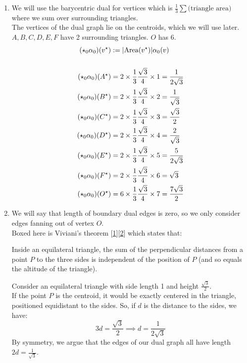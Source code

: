 \documentclass{article}
\newcommand\ifrac[2]{{\displaystyle\frac{#1}{#2}}}
\def\nt{\notag}
\begin{document}
\begin{enumerate}[label=(\alph*)]
    \item
    We will use the barycentric dual for vertices which is $\ifrac13 \sum\text{(triangle area)}$ where we sum over surrounding triangles.\\
    The vertices of the dual graph lie on the centroids, which we will use later.\\
    $A,B,C,D,E,F$ have 2 surrounding triangles. $O$ has 6. 
    \begin{align}
        (\star_0\alpha_0)(v^\star) &:= |\text{Area}(v^\star)|\alpha_0(v) \nt\\\nt\\
        (\star_0\alpha_0)(A^\star) &= 2 \times \frac13 \frac{\sqrt3}{4} \times 1 = \frac{1}{2 \sqrt{3}} \nt\\
        (\star_0\alpha_0)(B^\star) &= 2 \times \frac13 \frac{\sqrt3}{4} \times 2 = \frac{1}{\sqrt{3}} \nt\\
        (\star_0\alpha_0)(C^\star) &= 2 \times \frac13 \frac{\sqrt3}{4} \times 3 = \frac{\sqrt{3}}{2} \nt\\
        (\star_0\alpha_0)(D^\star) &= 2 \times \frac13 \frac{\sqrt3}{4} \times 4 = \frac{2}{\sqrt{3}} \nt\\
        (\star_0\alpha_0)(E^\star) &= 2 \times \frac13 \frac{\sqrt3}{4} \times 5 = \frac{5}{2 \sqrt{3}} \nt\\
        (\star_0\alpha_0)(F^\star) &= 2 \times \frac13 \frac{\sqrt3}{4} \times 6 = \sqrt{3} \nt\\
        (\star_0\alpha_0)(O^\star) &= 6 \times \frac13 \frac{\sqrt3}{4} \times 7 = \frac{7 \sqrt{3}}{2} \nt
    \end{align}

    \item 
    We will say that length of boundary dual edges is zero, so we only consider edges fanning out of vertex $O$.\\
    Boxed here is Viviani's theorem [\href{https://en.wikipedia.org/wiki/Viviani%27s_theorem}{1}][\href{https://www.google.com/url?sa=t&rct=j&q=&esrc=s&source=web&cd=&cad=rja&uact=8&ved=2ahUKEwjqvLnXps35AhXbGVkFHUDADcYQFnoECA0QAw&url=https%3A%2F%2Fwww.maa.org%2Fsites%2Fdefault%2Ffiles%2FChen-CMJ-2006.pdf&usg=AOvVaw0kXL5NnMvqD5_oh29f4N_H}{2}]
    which states that:
    \begin{mdframed}
    Inside an equilateral
    triangle, the sum of the perpendicular distances from a point $P$ to the three sides is independent
    of the position of $P$ (and so equals the altitude of the triangle).
    \end{mdframed}
    Consider an equilateral triangle with side length 1 and height $\ifrac{\sqrt3}{2}$. \\
    If the point $P$ is the centroid, it would be exactly centered in the triangle, positioned equidistant to the sides.
    So, if $d$ is the distance to the sides, we have: $$3d = \ifrac{\sqrt3}{2} \implies d = \frac{1}{2\sqrt3}$$
    By symmetry, we argue that the edges of our dual graph all have length $2d = \ifrac{1}{\sqrt3}$.


\end{enumerate}
\end{document}
